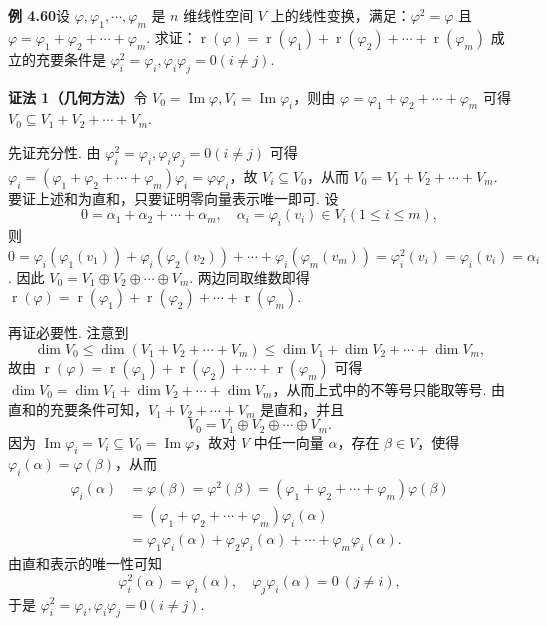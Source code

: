 \documentclass[UTF8,12pt,a4paper,fontset=fandol]{ctexart}
\begin{document}
\noindent\textbf{例 4.60}\quad 设 $\varphi,\varphi_1,\cdots,\varphi_m$ 是 $n$ 维线性空间 $V$ 上的线性变换，满足：$\varphi^2=\varphi$ 且 $\varphi=\varphi_1+\varphi_2+\cdots+\varphi_m$. 求证：$\operatorname{r}(\varphi)=\operatorname{r}(\varphi_1)+\operatorname{r}(\varphi_2)+\cdots+\operatorname{r}(\varphi_m)$ 成立的充要条件是 $\varphi_i^2=\varphi_i,\varphi_i\varphi_j=0(i\ne j)$.

\noindent\textbf{证法 1（几何方法）}\quad 令 $V_0=\operatorname{Im}\varphi,V_i=\operatorname{Im}\varphi_i$，则由 $\varphi=\varphi_1+\varphi_2+\cdots+\varphi_m$ 可得 $V_0\subseteq V_1+V_2+\cdots+V_m$.

先证充分性. 由 $\varphi_i^2=\varphi_i,\varphi_i\varphi_j=0(i\ne j)$ 可得 $\varphi_i=(\varphi_1+\varphi_2+\cdots+\varphi_m)\varphi_i=\varphi\varphi_i$，故 $V_i\subseteq V_0$，从而 $V_0=V_1+V_2+\cdots+V_m$. 要证上述和为直和，只要证明零向量表示唯一即可. 设
\[
0=\alpha_1+\alpha_2+\cdots+\alpha_m,\quad \alpha_i=\varphi_i(v_i)\in V_i(1\le i\le m),
\]
则 $0=\varphi_i(\varphi_1(v_1))+\varphi_i(\varphi_2(v_2))+\cdots+\varphi_i(\varphi_m(v_m))=\varphi_i^2(v_i)=\varphi_i(v_i)=\alpha_i$. 因此 $V_0=V_1\oplus V_2\oplus\cdots\oplus V_m$. 两边同取维数即得 $\operatorname{r}(\varphi)=\operatorname{r}(\varphi_1)+\operatorname{r}(\varphi_2)+\cdots+\operatorname{r}(\varphi_m)$.

再证必要性. 注意到
\[
\dim V_0\le\dim(V_1+V_2+\cdots+V_m)\le\dim V_1+\dim V_2+\cdots+\dim V_m,
\]
故由 $\operatorname{r}(\varphi)=\operatorname{r}(\varphi_1)+\operatorname{r}(\varphi_2)+\cdots+\operatorname{r}(\varphi_m)$ 可得 $\dim V_0=\dim V_1+\dim V_2+\cdots+\dim V_m$，从而上式中的不等号只能取等号. 由直和的充要条件可知，$V_1+V_2+\cdots+V_m$ 是直和，并且
\[
V_0=V_1\oplus V_2\oplus\cdots\oplus V_m.
\]
因为 $\operatorname{Im}\varphi_i=V_i\subseteq V_0=\operatorname{Im}\varphi$，故对 $V$ 中任一向量 $\alpha$，存在 $\beta\in V$，使得 $\varphi_i(\alpha)=\varphi(\beta)$，从而
\[
\begin{aligned}
\varphi_i(\alpha)
&=\varphi(\beta)=\varphi^2(\beta)=(\varphi_1+\varphi_2+\cdots+\varphi_m)\varphi(\beta)\\
&=(\varphi_1+\varphi_2+\cdots+\varphi_m)\varphi_i(\alpha)\\
&=\varphi_1\varphi_i(\alpha)+\varphi_2\varphi_i(\alpha)+\cdots+\varphi_m\varphi_i(\alpha).
\end{aligned}
\]
由直和表示的唯一性可知
\[
\varphi_i^2(\alpha)=\varphi_i(\alpha),\quad \varphi_j\varphi_i(\alpha)=0\ (j\ne i),
\]
于是 $\varphi_i^2=\varphi_i,\varphi_i\varphi_j=0(i\ne j)$.
\end{document}

